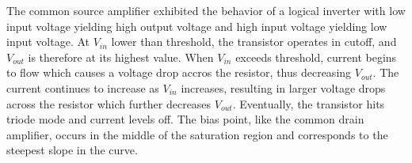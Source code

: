 The common source amplifier exhibited the behavior of a logical inverter with low input voltage yielding high output voltage and high input voltage yielding low input voltage. At $V_{in}$ lower than threshold, the transistor operates in cutoff, and $V_{out}$ is therefore at its highest value. When $V_{in}$ exceeds threshold, current begins to flow which causes a voltage drop accros the resistor, thus decreasing $V_{out}$. The current continues to increase as $V_{in}$ increases, resulting in larger voltage drops across the resistor which further decreases $V_{out}$. Eventually, the transistor hits triode mode and current levels off. The bias point, like the common drain amplifier, occurs in the middle of the saturation region and corresponds to the steepest slope in the curve.    

